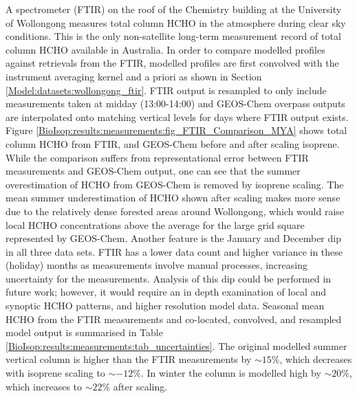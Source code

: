     A spectrometer (FTIR) on the roof of the Chemistry building at the University of Wollongong measures total column HCHO in the atmosphere during clear sky conditions.
    This is the only non-satellite long-term measurement record of total column HCHO available in Australia.
    In order to compare modelled profiles against retrievals from the FTIR, modelled profiles are first convolved with the instrument averaging kernel and a priori as shown in Section \ref{Model:datasets:wollongong_ftir}.
    FTIR output is resampled to only include measurements taken at midday (13:00-14:00) and GEOS-Chem overpass outputs are interpolated onto matching vertical levels for days where FTIR output exists.
    Figure \ref{BioIsop:results:measurements:fig_FTIR_Comparison_MYA} shows total column HCHO from FTIR, and GEOS-Chem before and after scaling isoprene.
    While the comparison suffers from representational error between FTIR measurements and GEOS-Chem output, one can see that the summer overestimation of HCHO from GEOS-Chem is removed by isoprene scaling.
    The mean summer underestimation of HCHO shown after scaling makes more sense due to the relatively dense forested areas around Wollongong, which would raise local HCHO concentrations above the average for the large grid square represented by GEOS-Chem.
    Another feature is the January and December dip in all three data sets.
    FTIR has a lower data count and higher variance in these (holiday) months as measurements involve manual processes, increasing uncertainty for the measurements.
    Analysis of this dip could be performed in future work; however, it would require an in depth examination of local and synoptic HCHO patterns, and higher resolution model data.
    Seasonal mean HCHO from the FTIR measurements and co-located, convolved, and resampled model output is summarised in Table \ref{BioIsop:results:measurements:tab_uncertainties}.
    The original modelled summer vertical column is higher than the FTIR measurements by $\sim{15}\%$, which decreases with isoprene scaling to $\sim{-12}\%$.
    In winter the column is modelled high by $\sim{20}\%$, which increases to $\sim{22}\%$ after scaling.
    
